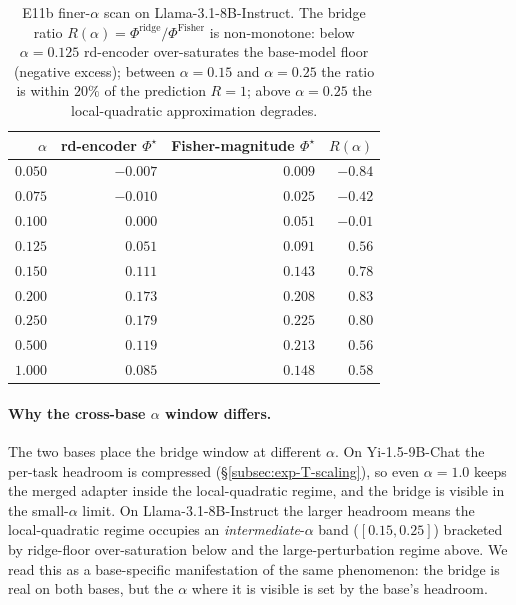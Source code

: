 \begin{table}[t]
\centering
\caption{E11b finer-$\alpha$ scan on Llama-3.1-8B-Instruct. The
bridge ratio $R(\alpha) = \Phi^{\mathrm{ridge}} /
\Phi^{\mathrm{Fisher}}$ is non-monotone: below $\alpha = 0.125$
rd-encoder over-saturates the base-model floor (negative excess);
between $\alpha = 0.15$ and $\alpha = 0.25$ the ratio is within $20\%$
of the prediction $R = 1$; above $\alpha = 0.25$ the local-quadratic
approximation degrades.}
\label{tab:e11b-llama-finer}
\small
\begin{tabular}{rrrr}
\hline
$\alpha$ & rd-encoder $\Phi^\star$ & Fisher-magnitude $\Phi^\star$ & $R(\alpha)$ \\
\hline
$0.050$ & $-0.007$ & $\phantom{-}0.009$ & $-0.84$ \\
$0.075$ & $-0.010$ & $\phantom{-}0.025$ & $-0.42$ \\
$0.100$ & $\phantom{-}0.000$ & $\phantom{-}0.051$ & $-0.01$ \\
$0.125$ & $\phantom{-}0.051$ & $\phantom{-}0.091$ & $\phantom{-}0.56$ \\
$0.150$ & $\phantom{-}0.111$ & $\phantom{-}0.143$ & $\phantom{-}0.78$ \\
$\mathbf{0.200}$ & $\mathbf{0.173}$ & $\mathbf{0.208}$ & $\mathbf{0.83}$ \\
$0.250$ & $\phantom{-}0.179$ & $\phantom{-}0.225$ & $\phantom{-}0.80$ \\
$0.500$ & $\phantom{-}0.119$ & $\phantom{-}0.213$ & $\phantom{-}0.56$ \\
$1.000$ & $\phantom{-}0.085$ & $\phantom{-}0.148$ & $\phantom{-}0.58$ \\
\hline
\end{tabular}
\end{table}

\paragraph{Why the cross-base $\alpha$ window differs.}
The two bases place the bridge window at different $\alpha$. On
Yi-1.5-9B-Chat the per-task headroom is compressed
(\S\ref{subsec:exp-T-scaling}), so even $\alpha = 1.0$ keeps the
merged adapter inside the local-quadratic regime, and the bridge is
visible in the small-$\alpha$ limit. On Llama-3.1-8B-Instruct the
larger headroom means the local-quadratic regime occupies an
\emph{intermediate}-$\alpha$ band ($[0.15, 0.25]$) bracketed by
ridge-floor over-saturation below and the large-perturbation
regime above. We read this as a base-specific manifestation of the
same phenomenon: the bridge is real on both bases, but the
$\alpha$ where it is visible is set by the base's headroom.

